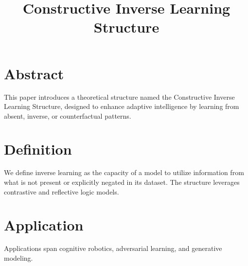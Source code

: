 \documentclass{article}
\title{Constructive Inverse Learning Structure}
\author{}
\date{}
\begin{document}
\maketitle

\section*{Abstract}
This paper introduces a theoretical structure named the Constructive Inverse Learning Structure, designed to enhance adaptive intelligence by learning from absent, inverse, or counterfactual patterns.

\section{Definition}
We define inverse learning as the capacity of a model to utilize information from what is not present or explicitly negated in its dataset. The structure leverages contrastive and reflective logic models.

\section{Application}
Applications span cognitive robotics, adversarial learning, and generative modeling.
\end{document}
